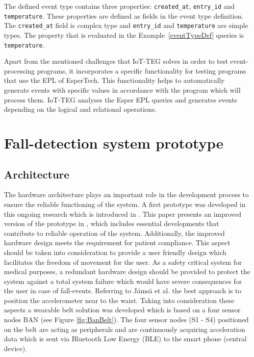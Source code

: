 \documentclass[review]{elsarticle}
\begin{document}
The defined event type contains three properties: \texttt{created\_at},
\texttt{entry\_id} and \texttt{temperature}. These properties are defined as
fields in the event type definition. The \texttt{created\_at} field is complex
type and \texttt{entry\_id} and \texttt{temperature} are simple types. The
property that is evaluated in the Example~\ref{eventTypeDef} queries is
\texttt{temperature}.

Apart from the mentioned challenges that IoT-TEG solves in order to test 
event-processing programs, it incorporates a specific functionality
for testing programs that use the EPL of EsperTech. This functionality helps to 
automatically generate events with specific values in accordance with the 
program which will process them. IoT-TEG analyses the Esper EPL queries and 
generates events depending on the logical and relational operations. 

\section{Fall-detection system prototype}
\label{sec:fall-detectionPrototype}	

\subsection{Architecture}
\label{subsec:Architecture}	
The hardware architecture plays an important role in the development process to ensure the reliable functioning of the system. A first prototype was developed in this ongoing research which is introduced in \cite{LaBlunda.2016, LaBlunda.2016b}. This paper presents an improved version of the prototype in \cite{LaBlunda.2016, LaBlunda.2016b}, which includes essential developments that contribute to reliable operation of the system. Additionally, the improved hardware design meets the requirement for patient compliance. This aspect should be taken into consideration to provide a user friendly design which facilitates the freedom of movement for the user. As a safety critical system for medical purposes, a redundant hardware design should be provided to protect the system against a total system failure which would have severe consequences for the user in case of fall-events. Referring to J{\"a}ms{\"a} et al. \cite{jamsa2014fall} the best approach is to position the accelerometer near to the waist. Taking into consideration these aspects a wearable belt solution was developed which is based on a four sensor nodes BAN (see Figure \ref{fig:BanBelt}). The four sensor nodes (S1 - S4) positioned on the belt are acting as peripherals and are continuously acquiring acceleration data which is sent via Bluetooth Low Energy (BLE) to the smart phone (central device). \newpage
\end{document}
